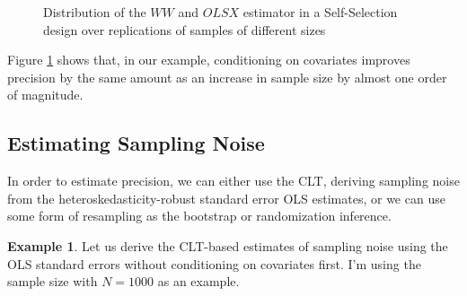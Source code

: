 \documentclass[
]{book}
\theoremstyle{definition}
\theoremstyle{definition}
\newtheorem{example}{Example}[chapter]
\theoremstyle{definition}
\theoremstyle{definition}
\theoremstyle{remark}
\begin{document}
\begin{figure}[htbp]

{\centering {}

}

\caption{Distribution of the $WW$ and $OLSX$ estimator in a Self-Selection design over replications of samples of different sizes}\label{fig:montecarlohistselfselectww}
\end{figure}

Figure \ref{fig:montecarlohistselfselectww} shows that, in our example, conditioning on covariates improves precision by the same amount as an increase in sample size by almost one order of magnitude.

\hypertarget{estimating-sampling-noise-1}{%
\subsection{Estimating Sampling Noise}\label{estimating-sampling-noise-1}}

In order to estimate precision, we can either use the CLT, deriving sampling noise from the heteroskedasticity-robust standard error OLS estimates, or we can use some form of resampling as the bootstrap or randomization inference.

\begin{example}
\protect\hypertarget{exm:unnamed-chunk-86}{}{\label{exm:unnamed-chunk-86} }Let us derive the CLT-based estimates of sampling noise using the OLS standard errors without conditioning on covariates first.
I'm using the sample size with \(N=1000\) as an example.
\end{example}
\end{document}

